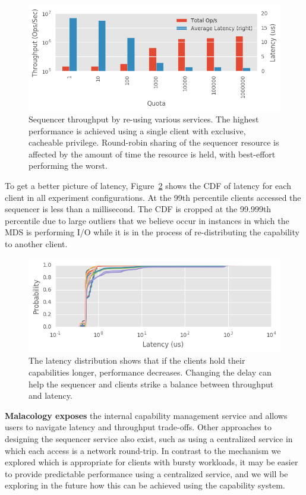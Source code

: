 \documentclass[preprint]{sigplanconf-eurosys}
\begin{document}
\begin{figure}[tbp]
\centering
\includegraphics{figures/tradeoff.png}
\caption{Sequencer throughput by re-using various services.  The highest performance is
achieved using a single client with exclusive, cacheable privilege. Round-robin
sharing of the sequencer resource is affected by the amount of time the
resource is held, with best-effort performing the worst.}
\label{fig:captp}
\end{figure}

To get a better picture of latency, Figure~\ref{fig:capcdf} shows the CDF of
latency for each client in all experiment configurations. At the 99th
percentile clients accessed the sequencer is less than a millisecond. The CDF
is cropped at the 99.999th percentile due to large outliers that we believe
occur in instances in which the MDS is performing I/O while it is in the
process of re-distributing the capability to another client.

\begin{figure}[tbp]
\centering
\includegraphics{figures/caps-delay-latency.png}
\caption{
The latency distribution shows that if the clients hold their capabilities longer,
performance decreases. Changing the delay can help the sequencer and
clients strike a balance between throughput and latency.}
\label{fig:capcdf}
\end{figure}

\textbf{Malacology exposes} the internal capability management service and
allows users to navigate latency and throughput trade-offs.  Other approaches to
designing the sequencer service also exist, such as using a centralized service
in which each access is a network round-trip. In contrast to the mechanism we
explored which is appropriate for clients with bursty workloads, it may be
easier to provide predictable performance using a centralized service, and we
will be exploring in the future how this can be achieved using the capability
system.
\end{document}
